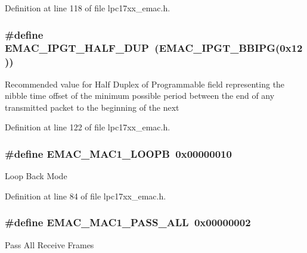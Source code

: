 \-Definition at line 118 of file lpc17xx\-\_\-emac.\-h.

\hypertarget{group___e_m_a_c___private___macros_gad4771025321fbd32b63ea62452759cb9}{
\subsubsection[{\-E\-M\-A\-C\-\_\-\-I\-P\-G\-T\-\_\-\-H\-A\-L\-F\-\_\-\-D\-U\-P}]{\setlength{\rightskip}{0pt plus 5cm}\#define {\bf \-E\-M\-A\-C\-\_\-\-I\-P\-G\-T\-\_\-\-H\-A\-L\-F\-\_\-\-D\-U\-P}~({\bf \-E\-M\-A\-C\-\_\-\-I\-P\-G\-T\-\_\-\-B\-B\-I\-P\-G}(0x12))}}\label{group___e_m_a_c___private___macros_gad4771025321fbd32b63ea62452759cb9}
\-Recommended value for \-Half \-Duplex of \-Programmable field representing the nibble time offset of the minimum possible period between the end of any transmitted packet to the beginning of the next 

\-Definition at line 122 of file lpc17xx\-\_\-emac.\-h.

\hypertarget{group___e_m_a_c___private___macros_ga5d1a3767e7126ac8ac3db9845435efc3}{
\subsubsection[{\-E\-M\-A\-C\-\_\-\-M\-A\-C1\-\_\-\-L\-O\-O\-P\-B}]{\setlength{\rightskip}{0pt plus 5cm}\#define {\bf \-E\-M\-A\-C\-\_\-\-M\-A\-C1\-\_\-\-L\-O\-O\-P\-B}~0x00000010}}\label{group___e_m_a_c___private___macros_ga5d1a3767e7126ac8ac3db9845435efc3}
\-Loop \-Back \-Mode 

\-Definition at line 84 of file lpc17xx\-\_\-emac.\-h.

\hypertarget{group___e_m_a_c___private___macros_gaecafe47b0ef6bf3e0ac573bb56f58649}{
\subsubsection[{\-E\-M\-A\-C\-\_\-\-M\-A\-C1\-\_\-\-P\-A\-S\-S\-\_\-\-A\-L\-L}]{\setlength{\rightskip}{0pt plus 5cm}\#define {\bf \-E\-M\-A\-C\-\_\-\-M\-A\-C1\-\_\-\-P\-A\-S\-S\-\_\-\-A\-L\-L}~0x00000002}}\label{group___e_m_a_c___private___macros_gaecafe47b0ef6bf3e0ac573bb56f58649}
\-Pass \-All \-Receive \-Frames 

